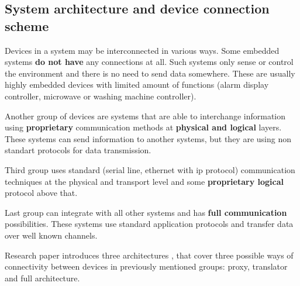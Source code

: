 \subsection{System architecture and  device connection scheme}

Devices in a system may be interconnected in various ways.
Some embedded systems \textbf{do not have} any connections at all. 
Such systems only sense or control the environment and there is no need to
send data somewhere. These are usually highly embedded devices with limited
amount of functions (alarm display controller, microwave or washing machine
controller).

Another group of devices are systems that are able to interchange
information using \textbf{proprietary} communication methods at \textbf{physical
and logical} layers. These systems can send information to another systems, but
they are using non standart protocols for data transmission.

Third group uses standard (serial line, ethernet with ip protocol)
communication techniques at the physical and transport level and some \textbf{proprietary
logical} protocol above that.

Last group can integrate with all other systems and has \textbf{full
communication} possibilities. These systems use standard application protocols
and transfer data over well known channels.

Research paper \cite{lws_milanovic.pdf} introduces three architectures , that
cover three possible ways of connectivity between devices in previously 
mentioned groups: proxy, translator and full architecture.

